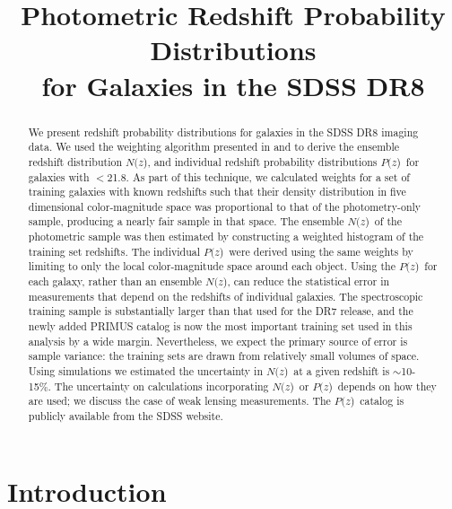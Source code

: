 \documentclass[preprint]{aastex}
\newcommand{\localbias}{10-15\%}
\newcommand{\rmax}{21.8}
\newcommand{\pofz}{$P(z$)}
\newcommand{\nofz}{$N(z$)}
\begin{document}
\title{Photometric Redshift Probability Distributions \\for Galaxies in the SDSS DR8}



\begin{abstract}


We present redshift probability distributions for galaxies in the SDSS DR8
imaging data.  We used the weighting algorithm presented in
\citet{LimaPhotoz08} and \citet{CunhaPhotoz09} to derive the ensemble redshift
distribution \nofz, and individual redshift probability distributions \pofz\
for galaxies with \rmag$ < $\rmax.  As part of this technique, we calculated
weights for a set of training galaxies with known redshifts such that their
density distribution in five dimensional color-magnitude space was proportional
to that of the photometry-only sample, producing a nearly fair sample in that
space.  The ensemble \nofz\ of the photometric sample was then estimated by
constructing a weighted histogram of the training set redshifts.  The
individual \pofz\ were derived using the same weights by limiting to only the
local color-magnitude space around each object.  Using the \pofz\ for each
galaxy, rather than an ensemble \nofz, can reduce the statistical error in
measurements that depend on the redshifts of individual galaxies. The
spectroscopic training sample is substantially larger than that used for the
DR7 release, and the newly added PRIMUS catalog is now the most important
training set used in this analysis by a wide margin.  Nevertheless, we expect
the primary source of error is sample variance: the training sets are drawn
from relatively small volumes of space.  Using simulations we estimated the
uncertainty in \nofz\ at a given redshift is $\sim$\localbias.  The uncertainty
on calculations incorporating \nofz\ or \pofz\ depends on how they are used; we
discuss the case of weak lensing measurements.  The \pofz\ catalog is publicly
available from the SDSS website.  

\end{abstract}

\section{Introduction} \label{sec:intro}
\end{document}

